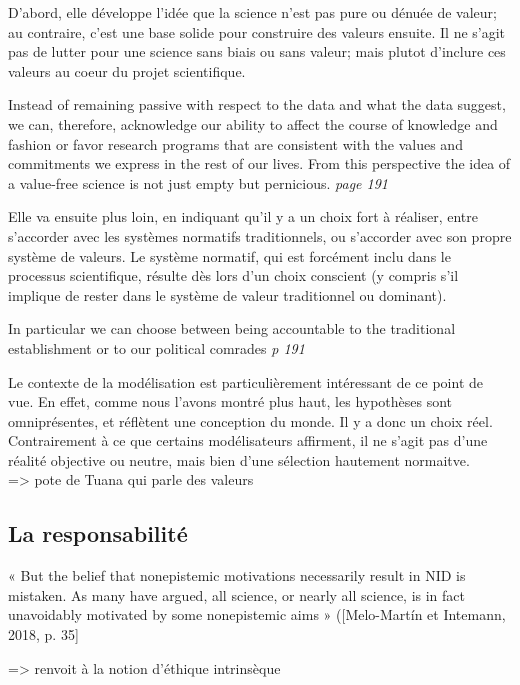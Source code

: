 D'abord, elle développe l'idée que la science n'est pas pure ou dénuée de valeur; au contraire, c'est une base solide pour construire des valeurs ensuite. Il ne s'agit pas de lutter pour une science sans biais ou sans valeur; mais plutot d'inclure ces valeurs au coeur du projet scientifique. 

\begin{displayquote}
    Instead of remaining passive with respect to the data and what the data suggest, we can, therefore, acknowledge our ability to affect the course of knowledge and fashion or favor research programs that are consistent with the values and commitments we express in the rest of our lives. From this perspective the idea of a value-free science is not just empty but pernicious. \textit{page 191}
\end{displayquote}

Elle va ensuite plus loin, en indiquant qu'il y a un choix fort à réaliser, entre s'accorder avec les systèmes normatifs traditionnels, ou s'accorder avec son propre système de valeurs. Le système normatif, qui est forcément inclu dans le processus scientifique, résulte dès lors d'un choix conscient (y compris s'il implique de rester dans le système de valeur traditionnel ou dominant). 

\begin{displayquote}
    In particular we can choose between being accountable to the traditional establishment or to our political comrades \textit{p 191}
\end{displayquote}

Le contexte de la modélisation est particulièrement intéressant de ce point de vue. En effet, comme nous l'avons montré plus haut, les hypothèses sont omniprésentes, et réflètent une conception du monde. Il y a donc un choix réel. Contrairement à ce que certains modélisateurs affirment, il ne s'agit pas d'une réalité objective ou neutre, mais bien d'une sélection hautement normaitve. \\




\cite{helgeson_attention_2022} => pote de Tuana qui parle des valeurs

\subsection{La responsabilité}

\begin{displayquote}
    « But the belief that nonepistemic motivations necessarily result in NID is mistaken. As many have argued, all science, or nearly all science, is in fact unavoidably motivated by some nonepistemic aims » ([Melo-Martín et Intemann, 2018, p. 35]
\end{displayquote}
=> renvoit à la notion d'éthique intrinsèque



